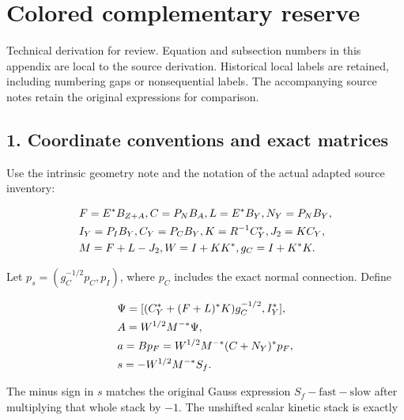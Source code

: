 \clearpage
\section{Colored complementary
reserve}\label{h-colored-complementary-reserve}

Technical derivation for review. Equation and subsection numbers in this
appendix are local to the source derivation. Historical local labels are
retained, including numbering gaps or nonsequential labels. The
accompanying source notes retain the original expressions for
comparison.

\subsection{1. Coordinate conventions and exact
matrices}\label{h-coordinate-conventions-and-exact-matrices}

Use the intrinsic geometry note and the notation of the actual adapted
source inventory:

\begin{gather*}
\begin{aligned}
& F=E^{*}B_{Z+A}, C=P_{N} B_{A}, L=E^{*}B_{Y}, N_{Y}=P_{N} B_{Y}, \\
& I_{Y}=P_{I} B_{Y}, C_{Y}=P_{C} B_{Y}, K=R^{-1}C_{Y}^{*}, J_{2}=KC_{Y}, \\
& M=F+L-J_{2}, W=I+KK^{*}, g_{C}=I+K^{*}K.
\end{aligned}\notag
\end{gather*}

Let \(p_{s}=(g_{C}^{-1/2} p_{C},p_{I})\), where \(p_{C}\) includes the
exact normal connection. Define

\begin{gather*}
\begin{aligned}
& \Psi  =[(C_{Y}^{*}+(F+L)^{*}K)g_{C}^{-1/2},I_{Y}^{*}], \\
& A=W^{1/2}M^{-*} \Psi  , \\
& a=Bp_{F}=W^{1/2}M^{-*}(C+N_{Y})^{*}p_{F}, \\
& s=-W^{1/2}M^{-*}S_{f}.
\end{aligned}\notag
\end{gather*}

The minus sign in \(s\) matches the original Gauss expression
\(S_{f}-\mathrm{fast}-\mathrm{slow}\) after multiplying that whole stack
by \(-1\). The unshifted scalar kinetic stack is exactly

